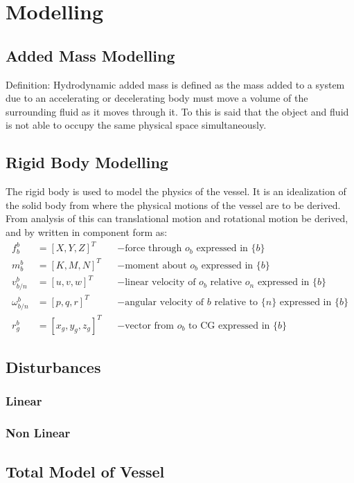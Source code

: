 \chapter{Modelling}

\section{Added Mass Modelling}
Definition: Hydrodynamic added mass is defined as the mass added to a system due to an accelerating or decelerating body must move a volume of the surrounding fluid as it moves through it. To this is said that the object and fluid is not able to occupy the same physical space simultaneously.

\section{Rigid Body Modelling}
The rigid body is used to model the physics of the vessel. It is an idealization of the solid body from where the physical motions of the vessel are to be derived. From analysis of this can translational motion and rotational motion be derived, and by \citep{fossen} written in component form as:
\begin{align}
f^b_b &= [X,Y,Z]^T & &- \text{force through } o_b \text{ expressed in } \{b\}\\
m^b_b &= [K,M,N]^T & &- \text{moment about } o_b \text{ expressed in } \{b\}\\
v^b_{b/n} &= [u,v,w]^T & &- \text{linear velocity of } o_b \text{ relative } o_n \text{ expressed in } \{b\}\\
\omega^b_{b/n} &= [p,q,r]^T & &- \text{angular velocity of } {b} \text{ relative to } \{n\} \text{ expressed in } \{b\}\\
r^b_g &= [x_g,y_g,z_g]^T & &- \text{vector from } o_b \text{ to CG expressed in } \{b\}
\end{align}

\section{Disturbances}


\subsection{Linear}


\subsection{Non Linear}


\section{Total Model of Vessel}


